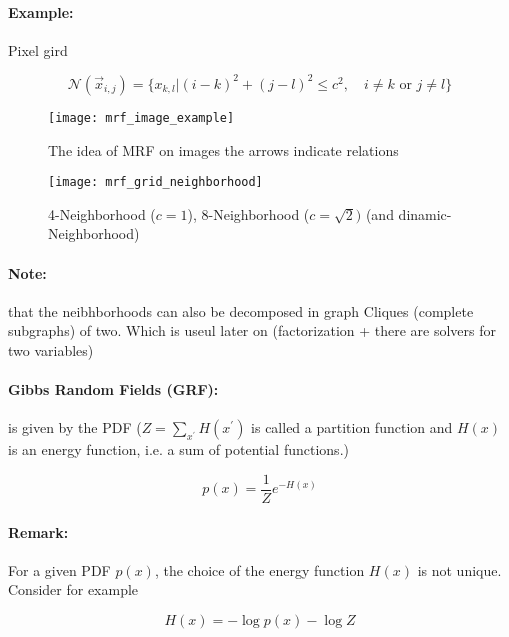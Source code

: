 \paragraph{Example:}
Pixel gird

\begin{equation*}
	\mathcal{N}(\vec{x}_{i,j}) = \{x_{k,l}| (i-k)^2 + (j-l)^2 \le c^2, \quad i \not = k \text{ or } j \not = l\}
\end{equation*}

\begin{figure}[H]
  \centering
  \begin{minipage}[b]{0.45\textwidth}
    \texttt{[image: mrf\_image\_example]}
		\caption{The idea of MRF on images the arrows indicate relations}
  \end{minipage}
  \begin{minipage}[b]{0.45\textwidth}
    \texttt{[image: mrf\_grid\_neighborhood]}
		\caption{4-Neighborhood ($c=1$), 8-Neighborhood ($c=\sqrt{2})$ (and dinamic-Neighborhood)}
  \end{minipage}
\end{figure}

\paragraph{Note:} that the neibhborhoods can also be decomposed in graph Cliques (complete subgraphs) of two. Which is useul later on (factorization + there are solvers for two variables)

\paragraph{Gibbs Random Fields (GRF):} is given by the PDF ($Z = \sum_{x^\prime} H(x^{\prime})$ is called a partition function and $H(x)$ is an energy function, i.e. a sum of potential functions.)

\begin{equation*}
	p(x) = \frac{1}{Z} e^{-H(x)}
\end{equation*}

\paragraph{Remark:}
For a given PDF $p(x)$, the choice of the energy function $H(x)$ is not unique. Consider for example

\begin{equation*}
	H(x) = - \log p(x) - \log Z
\end{equation*}

